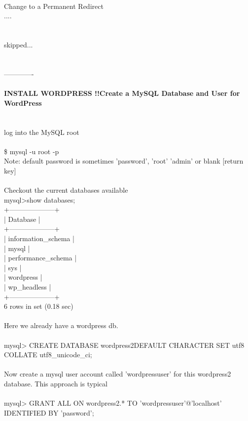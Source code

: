 \documentclass[10pt,a4paper]{article}
\begin{document}
{{{{{{{{{{{{{{{{{{\\
\\
\\
Change to a Permanent Redirect\\
....\\
\\
\\
skipped...\\
\\
\\
-------------\\
\\
}\textbf{{\Large INSTALL WORDPRESS !!}}{\large \textbf{Create a MySQL Database and User for WordPress}}{\large \\
\\
\\
log into the MySQL root\\
\\
\$ mysql -u root -p\\
Note: default password is sometimes 'password', 'root' 'admin' or blank [return key]\\
\\
Checkout the current databases available\\
mysql>show databases;\\
+--------------------+\\
| Database           |\\
+--------------------+\\
| information\_schema |\\
| mysql              |\\
| performance\_schema |\\
| sys                |\\
| wordpress          |\\
| wp\_headless        |\\
+--------------------+\\
6 rows in set (0.18 sec)\\
\\
Here we already have a wordpress db.\\
\\
mysql> CREATE DATABASE wordpress2}{\large  DEFAULT CHARACTER SET utf8 COLLATE utf8\_unicode\_ci;\\
\\
Now create a mysql user account called 'wordpressuser' for this wordpress2 database. This approach is typical\\
\\
mysql> GRANT ALL ON wordpress2.* TO 'wordpressuser}{\large '@'localhost' IDENTIFIED BY 'password}{\large ';\\
}}}}}}}}}}}}}}}}}}
\end{document}
